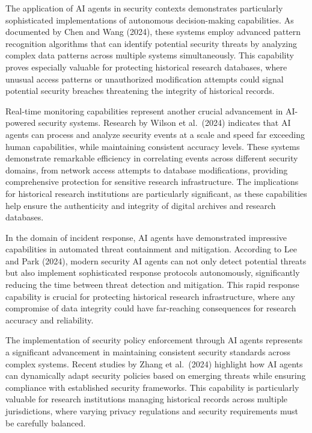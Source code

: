 \documentclass[
]{article}
\begin{document}
The application of AI agents in security contexts demonstrates
particularly sophisticated implementations of autonomous decision-making
capabilities. As documented by Chen and Wang (2024), these systems
employ advanced pattern recognition algorithms that can identify
potential security threats by analyzing complex data patterns across
multiple systems simultaneously. This capability proves especially
valuable for protecting historical research databases, where unusual
access patterns or unauthorized modification attempts could signal
potential security breaches threatening the integrity of historical
records.

Real-time monitoring capabilities represent another crucial advancement
in AI-powered security systems. Research by Wilson et al.~(2024)
indicates that AI agents can process and analyze security events at a
scale and speed far exceeding human capabilities, while maintaining
consistent accuracy levels. These systems demonstrate remarkable
efficiency in correlating events across different security domains, from
network access attempts to database modifications, providing
comprehensive protection for sensitive research infrastructure. The
implications for historical research institutions are particularly
significant, as these capabilities help ensure the authenticity and
integrity of digital archives and research databases.

In the domain of incident response, AI agents have demonstrated
impressive capabilities in automated threat containment and mitigation.
According to Lee and Park (2024), modern security AI agents can not only
detect potential threats but also implement sophisticated response
protocols autonomously, significantly reducing the time between threat
detection and mitigation. This rapid response capability is crucial for
protecting historical research infrastructure, where any compromise of
data integrity could have far-reaching consequences for research
accuracy and reliability.

The implementation of security policy enforcement through AI agents
represents a significant advancement in maintaining consistent security
standards across complex systems. Recent studies by Zhang et al.~(2024)
highlight how AI agents can dynamically adapt security policies based on
emerging threats while ensuring compliance with established security
frameworks. This capability is particularly valuable for research
institutions managing historical records across multiple jurisdictions,
where varying privacy regulations and security requirements must be
carefully balanced.
\end{document}
